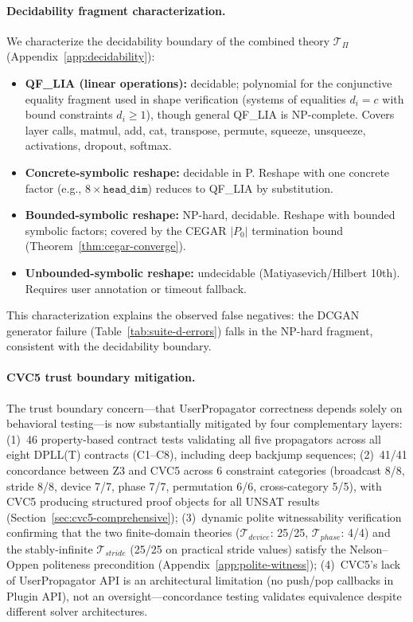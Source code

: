 \documentclass[11pt]{article}
\begin{document}
\paragraph{Decidability fragment characterization.}
We characterize the decidability boundary of the combined theory
$\mathcal{T}_\Pi$ (Appendix~\ref{app:decidability}):
\begin{itemize}[leftmargin=2em,nosep]
  \item \textbf{QF\_LIA (linear operations):} decidable;
    polynomial for the conjunctive equality fragment used in
    shape verification (systems of equalities $d_i = c$ with
    bound constraints $d_i \geq 1$), though general QF\_LIA
    is NP-complete.
    Covers layer calls, matmul, add, cat, transpose, permute,
    squeeze, unsqueeze, activations, dropout, softmax.
  \item \textbf{Concrete-symbolic reshape:} decidable in P.
    Reshape with one concrete factor (e.g., $8 \times \texttt{head\_dim}$)
    reduces to QF\_LIA by substitution.
  \item \textbf{Bounded-symbolic reshape:} NP-hard, decidable.
    Reshape with bounded symbolic factors; covered by the CEGAR
    $|P_0|$ termination bound (Theorem~\ref{thm:cegar-converge}).
  \item \textbf{Unbounded-symbolic reshape:} undecidable
    (Matiyasevich/Hilbert 10th).  Requires user annotation or timeout
    fallback.
\end{itemize}
This characterization explains the observed false negatives: the DCGAN
generator failure (Table~\ref{tab:suite-d-errors}) falls in the NP-hard
fragment, consistent with the decidability boundary.

\paragraph{CVC5 trust boundary mitigation.}
The trust boundary concern---that UserPropagator correctness depends
solely on behavioral testing---is now substantially mitigated by four
complementary layers: (1)~46 property-based contract tests validating
all five propagators across all eight DPLL(T) contracts (C1--C8),
including deep backjump sequences;
(2)~41/41 concordance between Z3 and CVC5 across 6 constraint categories
(broadcast 8/8, stride 8/8, device 7/7, phase 7/7, permutation 6/6,
cross-category 5/5), with CVC5 producing structured proof
objects for all UNSAT results (Section~\ref{sec:cvc5-comprehensive});
(3)~dynamic polite witnessability verification confirming that the two
finite-domain theories ($\mathcal{T}_{\mathit{device}}$: 25/25,
$\mathcal{T}_{\mathit{phase}}$: 4/4)
and the stably-infinite $\mathcal{T}_{\mathit{stride}}$ (25/25 on
practical stride values) satisfy the
Nelson--Oppen politeness precondition (Appendix~\ref{app:polite-witness});
(4)~CVC5's lack of UserPropagator API is an architectural limitation
(no push/pop callbacks in Plugin API), not an oversight---concordance
testing validates equivalence despite different solver architectures.
\end{document}
